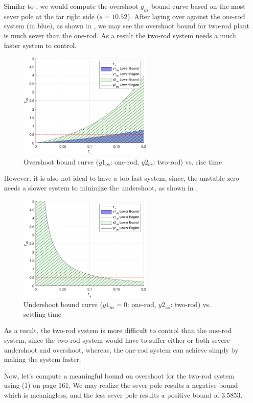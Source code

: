 \documentclass{tron}
\begin{document}
Similar to , we would compute the overshoot $y_{os}$ bound curve based on the most sever pole at the far right side ($s=10.52$). After laying over against the one-rod system (in blue), as shown in , we may see the overshoot bound for two-rod plant is much sever than the one-rod. As a result the two-rod system needs a much faster system to control. 
\begin{figure}[H]
	\centering
	\includegraphics[height=200px]{../matlab/output/p4/y2_os-bound}
	\caption{Overshoot bound curve ($y1_{os}$: one-rod, $y2_{os}$: two-rod) vs. rise time}
	\label{fig:2rod:os}
\end{figure}

However, it is also not ideal to have a too fast system, since, the unstable zero needs a slower system to minimize the undershoot, as shown in .
\begin{figure}[H]
	\centering
	\includegraphics[height=200px]{../matlab/output/p4/y2_us-bound}
	\caption{Undershoot bound curve ($y1_{us}=0$: one-rod, $y2_{us}$: two-rod) vs. settling time}
	\label{fig:2rod:us}
\end{figure}

As a result, the two-rod system is more difficult to control than the one-rod system, since the two-rod system would have to suffer either or both severe undershoot and overshoot, whereas, the one-rod system can achieve simply by making the system faster.

Now, let's compute a meaningful bound on overshoot for the two-rod system using (1) on page 161. We may realize the sever pole results a negative bound which is meaningless, and the less sever pole results a positive bound of $3.5853$.
\end{document}
